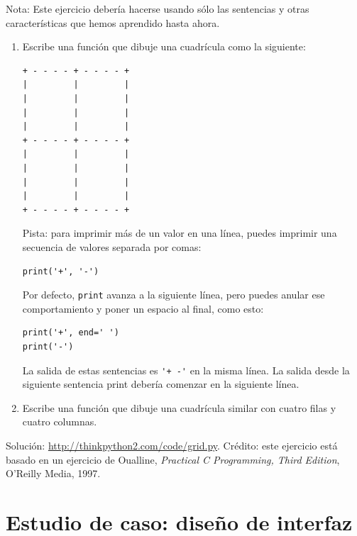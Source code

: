 \documentclass[10pt]{book}
\begin{document}
\begin{exercise}

Nota: Este ejercicio debería hacerse
usando sólo las sentencias y otras características que hemos aprendido hasta
ahora.

\begin{enumerate}

\item Escribe una función que dibuje una cuadrícula como la siguiente:

\begin{verbatim}
+ - - - - + - - - - +
|         |         |
|         |         |
|         |         |
|         |         |
+ - - - - + - - - - +
|         |         |
|         |         |
|         |         |
|         |         |
+ - - - - + - - - - +
\end{verbatim}
%
Pista: para imprimir más de un valor en una línea, puedes imprimir
una secuencia de valores separada por comas:

\begin{verbatim}
print('+', '-')
\end{verbatim}
%
Por defecto, {\tt print} avanza a la siguiente línea, pero
puedes anular ese comportamiento y poner un espacio al final, como esto:

\begin{verbatim}
print('+', end=' ')
print('-')
\end{verbatim}
%
La salida de estas sentencias es \verb"'+ -'" en la misma línea.
La salida desde la siguiente sentencia print debería comenzar en la siguiente línea.

\item Escribe una función que dibuje una cuadrícula similar
con cuatro filas y cuatro columnas.

\end{enumerate}

Solución: \url{http://thinkpython2.com/code/grid.py}.
Crédito: este ejercicio está basado en un ejercicio de Oualline, {\em
    Practical C Programming, Third Edition}, O'Reilly Media, 1997.

\end{exercise}





\chapter{Estudio de caso: diseño de interfaz}
\label{turtlechap}
\end{document}
